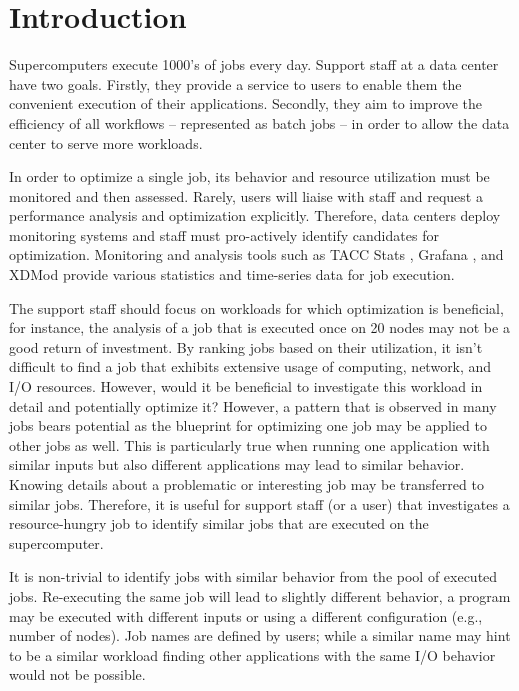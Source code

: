 \documentclass{jhps}
\begin{document}
\section{Introduction}

Supercomputers execute 1000's of jobs every day.
Support staff at a data center have two goals.
Firstly, they provide a service to users to enable them the convenient execution of their applications.
Secondly, they aim to improve the efficiency of all workflows -- represented as batch jobs -- in order to allow the data center to serve more workloads.

In order to optimize a single job, its behavior and resource utilization must be monitored and then assessed.
Rarely, users will liaise with staff and request a performance analysis and optimization explicitly.
Therefore, data centers deploy monitoring systems and staff must pro-actively identify candidates for optimization.
Monitoring and analysis tools such as TACC Stats \cite{evans2014comprehensive}, Grafana \cite{chan2019resource}, and XDMod \cite{simakov2018workload} provide various statistics and time-series data for job execution.

The support staff should focus on workloads for which optimization is beneficial, for instance, the analysis of a job that is executed once on 20 nodes may not be a good return of investment.
By ranking jobs based on their utilization, it isn't difficult to find a job that exhibits extensive usage of computing, network, and I/O resources.
However, would it be beneficial to investigate this workload in detail and potentially optimize it?
However, a pattern that is observed in many jobs bears potential as the blueprint for optimizing one job may be applied to other jobs as well.
This is particularly true when running one application with similar inputs but also different applications may lead to similar behavior.
Knowing details about a problematic or interesting job may be transferred to similar jobs.
Therefore, it is useful for support staff (or a user) that investigates a resource-hungry job to identify similar jobs that are executed on the supercomputer.

It is non-trivial to identify jobs with similar behavior from the pool of executed jobs.
Re-executing the same job will lead to slightly different behavior, a program may be executed with different inputs or using a different configuration (e.g., number of nodes).
Job names are defined by users; while a similar name may hint to be a similar workload finding other applications with the same I/O behavior would not be possible.
\end{document}
